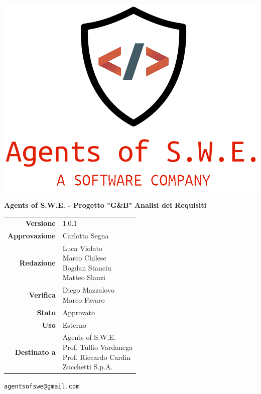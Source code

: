 


\begin{titlepage}
\thispagestyle{empty}

\begin{center}

\includegraphics[scale=0.3]{./images/logo.png} 

\large \textbf{Agents of S.W.E. - Progetto "G\&B"}
\vfill
\Huge \textbf{Analisi dei Requisiti}
\vfill
\large
\renewcommand{\arraystretch}{1.3}
\begin{tabular}{r|l}
\textbf{Versione} & 1.0.1\\
\textbf{Approvazione} & Carlotta Segna\\
\textbf{Redazione} & \parbox[t]{5cm}{Luca Violato\\Marco Chilese\\Bogdan Stanciu\\Matteo Slanzi}\\
\textbf{Verifica} & \parbox[t]{5cm}{Diego Mazzalovo\\Marco Favaro}\\
\textbf{Stato} & Approvato\\
\textbf{Uso} & Esterno\\
\textbf{Destinato a} & \parbox[t]{5cm}{Agents of S.W.E. \\Prof. Tullio Vardanega\\Prof. Riccardo Cardin \\ Zucchetti S.p.A.}
\end{tabular}
\vfill
\small
\texttt{agentsofswe@gmail.com}
\end{center}
\end{titlepage}

